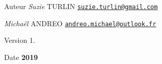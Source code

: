 \begin{DoxyAuthor}{Auteur}
{\itshape Suzie} T\+U\+R\+L\+IN \href{mailto:suzie.turlin@gmail.com}{\tt suzie.\+turlin@gmail.\+com} 

{\itshape Michaël} A\+N\+D\+R\+EO \href{mailto:andreo.michael@outlook.fr}{\tt andreo.\+michael@outlook.\+fr} 
\end{DoxyAuthor}
\begin{DoxyVersion}{Version}
1. 
\end{DoxyVersion}
\begin{DoxyDate}{Date}
{\bfseries 2019} 
\end{DoxyDate}
